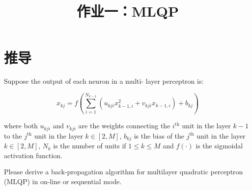 \endofdump
{}

    \title{作业一：MLQP}
    \maketitle

    \tableofcontents
    \clearpage

    \section{推导}
    \begin{problem}
        Suppose the output of each neuron in a multi-
layer perceptron is:

\begin{equation}\label{eq:def}
    x_{kj} = f\left(\sum_{i=1}^{N_{k-1}}(u_{kji}x_{k-1,i}^2+v_{kji}x_{k-1,i})+b_{kj}\right)
\end{equation}

where both $u_{kji}$ and $v_{kji}$ are the weights connecting the $i^\text{th}$ unit in the layer $k-1$ to the $j^\text{th}$ unit in the layer $k\in[2,M]$, $b_{kj}$ is 
the bias of the $j^\text{th}$ unit in the layer $k\in[2,M]$, $N_k$ is the number of 
units  if $1\leq k\leq M$ and $f(\cdot)$ is the sigmoidal activation 
function. 

Please derive a back-propagation algorithm for multilayer 
quadratic perceptron (MLQP) in on-line or sequential 
mode.
    \end{problem}

